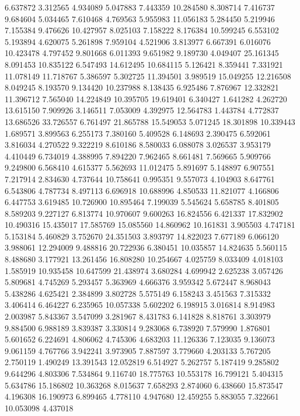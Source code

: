 6.637872
3.312565
4.934089
5.047883
7.443359
10.284580
8.308714
7.416737
9.684604
5.034465
7.610468
4.769563
5.955983
11.056183
5.284450
5.219946
7.155384
9.476626
10.427957
8.025103
7.158222
8.176384
10.599245
6.553102
5.193894
4.620075
5.261898
7.959104
4.521906
3.813977
6.667391
6.016076
10.423478
4.797452
9.801668
6.011393
9.651982
9.189730
4.049407
25.161345
8.091453
10.835122
6.547493
14.612495
10.684115
5.126421
8.359441
7.331921
11.078149
11.718767
5.386597
5.302725
11.394501
3.989519
15.049255
12.216508
8.049245
8.193570
9.134420
10.237988
8.138435
6.925486
7.876967
12.332821
11.396712
7.565040
14.224849
10.395705
19.619401
6.340427
1.641282
4.262720
13.615150
7.909926
3.146511
7.053009
4.392975
12.564783
1.443784
4.772837
13.686526
33.726557
6.761497
21.865788
15.549053
5.071245
18.301898
10.339443
1.689571
3.899563
6.255173
7.380160
5.409528
6.148693
2.390475
6.592061
3.816034
4.270522
9.322219
8.610186
8.580033
6.088078
3.026537
3.953179
4.410449
6.734019
4.388995
7.894220
7.962465
8.661481
7.569665
5.909766
9.249800
6.568410
4.615377
5.562693
11.012475
5.891697
5.148897
6.907551
7.217914
2.834630
4.737644
10.758641
0.995351
9.557073
4.104903
8.647761
6.543806
4.787734
8.497113
6.696918
10.688996
4.850533
11.821077
4.166806
6.447753
3.619485
10.726900
10.895464
7.199039
5.545624
5.658785
8.401805
8.589203
9.227127
6.813774
10.970607
9.600263
16.824556
6.421337
17.832902
10.490316
15.435017
17.585769
15.085560
14.860962
10.161831
3.905503
4.747181
5.153184
5.460829
3.752670
24.351503
3.893797
14.822023
7.677189
6.066120
3.988061
12.294009
9.488816
20.722936
6.380451
10.035857
14.824635
5.560115
8.488680
3.177921
13.261456
16.808280
10.254667
4.025759
8.033409
4.018103
1.585919
10.935458
10.647599
21.438974
3.680284
4.699942
2.625238
3.057426
5.809681
4.745269
5.293457
5.363969
4.666376
3.959342
5.672447
8.968043
5.438286
4.625421
2.384899
3.802728
5.575149
6.158243
3.451563
7.315332
3.406414
6.464227
6.235965
10.057338
5.602202
6.198915
3.016814
8.914983
2.003987
5.843367
3.547099
3.281967
8.431783
6.141828
8.818761
3.303979
9.884500
6.988189
3.839387
3.330814
9.283068
6.738920
7.579990
1.876801
5.601652
6.224691
4.806062
4.745306
4.683203
11.126336
7.123035
9.136073
9.061159
4.767766
3.942241
3.973905
7.887597
3.779660
4.203133
5.767205
2.750119
1.490249
13.391543
12.052819
6.514927
5.262757
5.187419
9.285802
9.644296
4.803306
7.534864
9.116740
18.775763
10.553178
16.799121
5.404315
5.634786
15.186802
10.363268
8.015637
7.658293
2.874060
6.438660
15.873547
4.196308
16.190973
6.899465
4.778110
4.947680
12.459255
5.883055
7.322661
10.053098
4.437018
